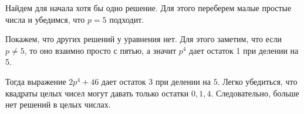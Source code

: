 \solutionSection

Найдем для начала хотя бы одно решение. Для этого переберем малые простые числа и убедимся, что $p = 5$ подходит.
	
Покажем, что других решений у уравнения нет. Для этого заметим, что если $p \neq 5$, то оно взаимно просто с пятью, а значит $p^4$ дает остаток 1 при делении на 5.

Тогда выражение $2p^4 + 46$ дает остаток $3$ при делении на $5$. Легко убедиться, что квадраты целых чисел могут давать только остатки $0, 1, 4$. Следовательно, больше нет решений в целых числах.

	
